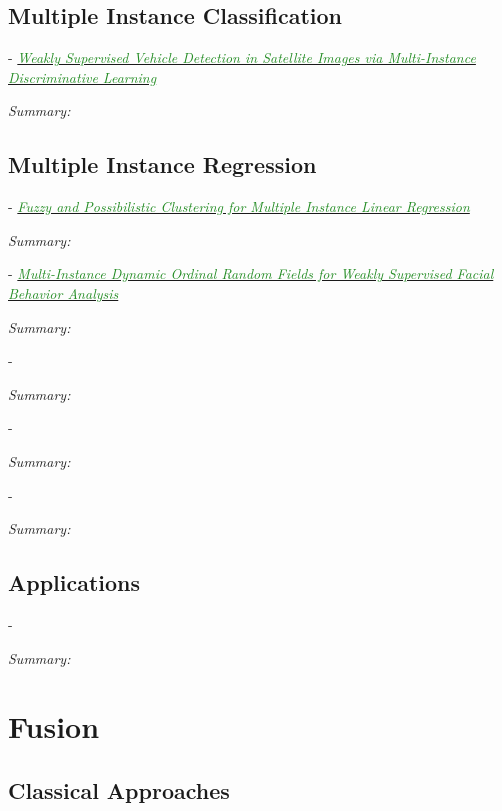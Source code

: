 \documentclass[]{article}
\newcommand{\paperentry}[4]{
            \hangindent=1cm
            \cite{#1} - \href{run:../References/#3}{\textcolor{ForestGreen}{\textit{#2}}}
            
            \noindent            
            \begin{minipage}[t]{0.1\linewidth}\hfill\end{minipage}
            \begin{minipage}[t]{0.8\linewidth}\textcolor{NavyBlue}{{\textit{Summary:}}}#4\end{minipage}
            \vspace{.25cm}
          }
\begin{document}
		
		
		
	
	\subsection{Multiple Instance Classification}
	
		\paperentry{Cao2016VehicleDetectionMIL}
		{Weakly Supervised Vehicle Detection in Satellite Images via Multi-Instance Discriminative Learning}
		{Multiple_Instance_Learning/Cao2016VehicleDetectionMIL.pdf}
		{}
		
	
	\subsection{Multiple Instance Regression}
	
		\paperentry{Trabelsi2018FuzzyClusteringMILRegression}
		{Fuzzy and Possibilistic Clustering for Multiple Instance Linear Regression}
		{Multiple_Instance_Learning/Trabelsi2018FuzzyClusteringMILRegression.pdf}
		{}
		
		\paperentry{Ruiz2018MIDynamicOrdinalRegression}
		{Multi-Instance Dynamic Ordinal Random Fields for Weakly Supervised Facial Behavior Analysis}
		{Multiple_Instance_Learning/Ruiz2018MIDynamicOrdinalRegression.pdf}
		{}
		
		\paperentry{}
		{}
		{Multiple_Instance_Learning/}
		{}
		
		\paperentry{}
		{}
		{Multiple_Instance_Learning/}
		{}
		
		\paperentry{}
		{}
		{Multiple_Instance_Learning/}
		{}


	\subsection{Applications}
	
		\paperentry{}
		{}
		{}
		{}
		


\section{Fusion}
	
	\subsection{Classical Approaches}
\end{document}

